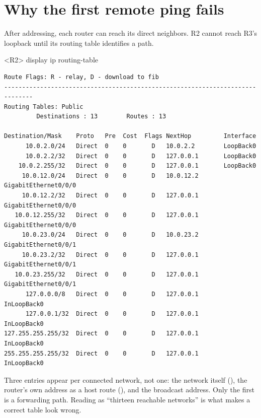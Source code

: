 
\section{Why the first remote ping fails}
After addressing, each router can reach its direct neighbors. R2 cannot reach R3's loopback  until its routing table identifies a path.

\begin{vrpbox}{<R2> display ip routing-table}
\begin{lstlisting}[style=dcnvrp]
Route Flags: R - relay, D - download to fib
------------------------------------------------------------------------------
Routing Tables: Public
         Destinations : 13        Routes : 13

Destination/Mask    Proto   Pre  Cost  Flags NextHop         Interface
      10.0.2.0/24   Direct  0    0       D   10.0.2.2        LoopBack0
      10.0.2.2/32   Direct  0    0       D   127.0.0.1       LoopBack0
    10.0.2.255/32   Direct  0    0       D   127.0.0.1       LoopBack0
     10.0.12.0/24   Direct  0    0       D   10.0.12.2       GigabitEthernet0/0/0
     10.0.12.2/32   Direct  0    0       D   127.0.0.1       GigabitEthernet0/0/0
   10.0.12.255/32   Direct  0    0       D   127.0.0.1       GigabitEthernet0/0/0
     10.0.23.0/24   Direct  0    0       D   10.0.23.2       GigabitEthernet0/0/1
     10.0.23.2/32   Direct  0    0       D   127.0.0.1       GigabitEthernet0/0/1
   10.0.23.255/32   Direct  0    0       D   127.0.0.1       GigabitEthernet0/0/1
      127.0.0.0/8   Direct  0    0       D   127.0.0.1       InLoopBack0
      127.0.0.1/32  Direct  0    0       D   127.0.0.1       InLoopBack0
127.255.255.255/32  Direct  0    0       D   127.0.0.1       InLoopBack0
255.255.255.255/32  Direct  0    0       D   127.0.0.1       InLoopBack0
\end{lstlisting}
\end{vrpbox}

\begin{pitfall}
Three entries appear per connected network, not one: the network itself
(), the router's own address as a host route (), and the
broadcast address. Only the first is a forwarding path. Reading
 as ``thirteen reachable networks'' is what makes a
correct table look wrong.
\end{pitfall}

